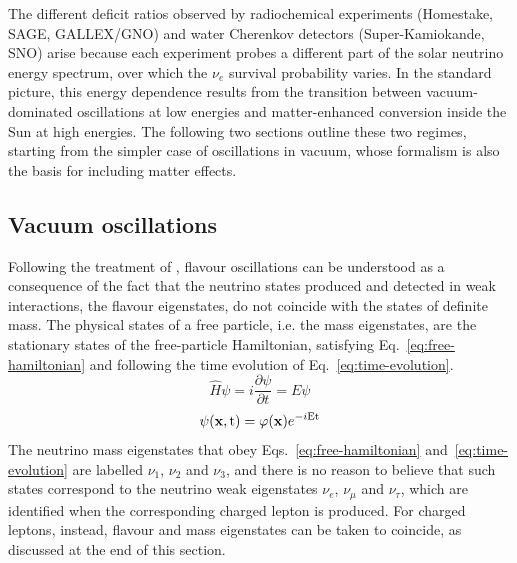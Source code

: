 The different deficit ratios observed by radiochemical experiments (Homestake, SAGE, GALLEX/GNO) and water Cherenkov detectors (Super-Kamiokande, SNO) arise because each experiment probes a different part of the solar neutrino energy spectrum, over which the $\nu_e$ survival probability varies. In the standard picture, this energy dependence results from the transition between vacuum-dominated oscillations at low energies and matter-enhanced conversion inside the Sun at high energies. The following two sections outline these two regimes, starting from the simpler case of oscillations in vacuum, whose formalism is also the basis for including matter effects.



\subsection{Vacuum oscillations}
\label{subsec:VacuumOscillations}

Following the treatment of \cite{Thomson}, flavour oscillations can be understood as a consequence of the fact that the neutrino states produced and detected in weak interactions, the flavour eigenstates, do not coincide with the states of definite mass. The physical states of a free particle, i.e. the mass eigenstates, are the stationary states of the free-particle Hamiltonian, satisfying Eq.~\ref{eq:free-hamiltonian} and following the time evolution of Eq.~\ref{eq:time-evolution}.
\begin{equation}
    \label{eq:free-hamiltonian}
    \hat{H} \psi = i \frac{\partial \psi}{\partial t} = E \psi
\end{equation}
\begin{equation}
    \label{eq:time-evolution}
    \psi(\text{\textbf{x}}, \text{t}) = \varphi (\text{\textbf{x}}) e ^{-i \text{Et}}
\end{equation}
The neutrino mass eigenstates that obey Eqs.~\ref{eq:free-hamiltonian} and~\ref{eq:time-evolution} are labelled $\nu_1$, $\nu_2$ and $\nu_3$, and there is no reason to believe that such states correspond to the neutrino weak eigenstates $\nu_e$, $\nu_\mu$ and $\nu_\tau$, which are identified when the corresponding charged lepton is produced. For charged leptons, instead, flavour and mass eigenstates can be taken to coincide, as discussed at the end of this section.

